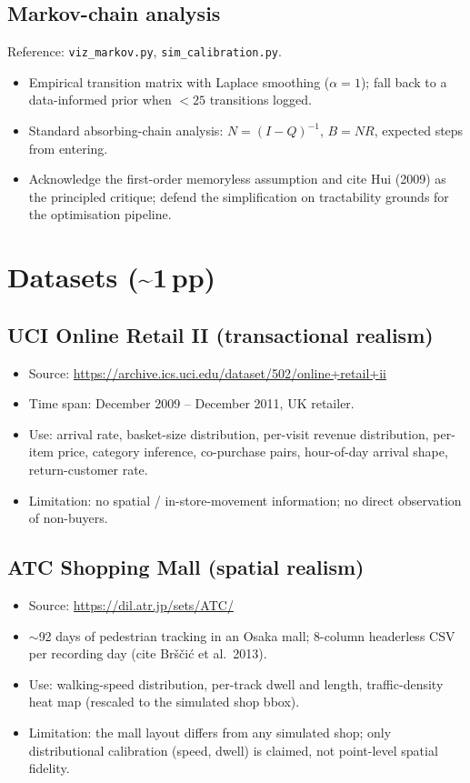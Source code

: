 \documentclass[11pt]{article}
\begin{document}
\subsection{Markov-chain analysis}
Reference: \texttt{viz\_markov.py}, \texttt{sim\_calibration.py}.
\begin{itemize}[leftmargin=*]
  \item Empirical transition matrix with Laplace smoothing
    ($\alpha=1$); fall back to a data-informed prior when
    $<25$ transitions logged.
  \item Standard absorbing-chain analysis: $N = (I-Q)^{-1}$,
    $B = NR$, expected steps from entering.
  \item Acknowledge the first-order memoryless assumption and cite
    Hui (2009) as the principled critique; defend the simplification
    on tractability grounds for the optimisation pipeline.
\end{itemize}

\section{Datasets (\textasciitilde 1\,pp)}

\subsection{UCI Online Retail II (transactional realism)}
\begin{itemize}[leftmargin=*]
  \item Source: \url{https://archive.ics.uci.edu/dataset/502/online+retail+ii}
  \item Time span: December 2009 -- December 2011, UK retailer.
  \item Use: arrival rate, basket-size distribution, per-visit revenue
    distribution, per-item price, category inference, co-purchase
    pairs, hour-of-day arrival shape, return-customer rate.
  \item Limitation: no spatial / in-store-movement information; no
    direct observation of non-buyers.
\end{itemize}

\subsection{ATC Shopping Mall (spatial realism)}
\begin{itemize}[leftmargin=*]
  \item Source: \url{https://dil.atr.jp/sets/ATC/}
  \item $\sim$92 days of pedestrian tracking in an Osaka mall;
    8-column headerless CSV per recording day (cite Bršči{\'c}
    et al.\ 2013).
  \item Use: walking-speed distribution, per-track dwell and length,
    traffic-density heat map (rescaled to the simulated shop bbox).
  \item Limitation: the mall layout differs from any simulated shop;
    only distributional calibration (speed, dwell) is claimed,
    not point-level spatial fidelity.
\end{itemize}
\end{document}
